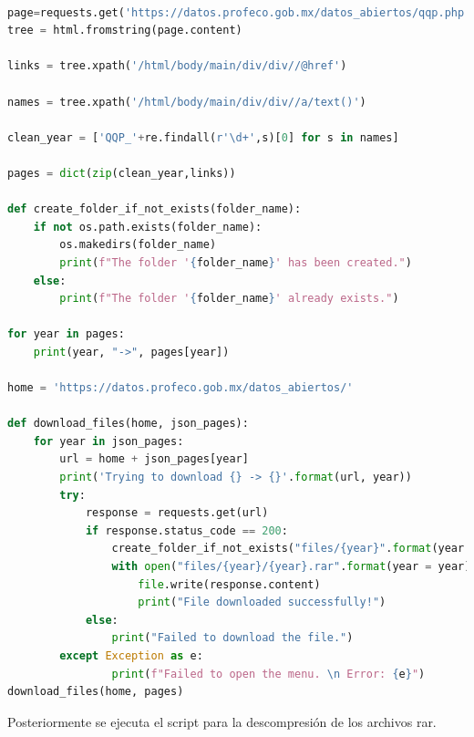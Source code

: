 \documentclass{article}
\begin{document}
\begin{lstlisting}[language=Python, caption={python version}]

page=requests.get('https://datos.profeco.gob.mx/datos_abiertos/qqp.php')
tree = html.fromstring(page.content)

links = tree.xpath('/html/body/main/div/div//@href')

names = tree.xpath('/html/body/main/div/div//a/text()')

clean_year = ['QQP_'+re.findall(r'\d+',s)[0] for s in names]

pages = dict(zip(clean_year,links))

def create_folder_if_not_exists(folder_name):
    if not os.path.exists(folder_name):
        os.makedirs(folder_name)
        print(f"The folder '{folder_name}' has been created.")
    else:
        print(f"The folder '{folder_name}' already exists.")

for year in pages:
    print(year, "->", pages[year])

home = 'https://datos.profeco.gob.mx/datos_abiertos/'

def download_files(home, json_pages):
    for year in json_pages:
        url = home + json_pages[year]
        print('Trying to download {} -> {}'.format(url, year))
        try:
            response = requests.get(url)
            if response.status_code == 200:
                create_folder_if_not_exists("files/{year}".format(year = year))
                with open("files/{year}/{year}.rar".format(year = year), "wb") as file:
                    file.write(response.content)
                    print("File downloaded successfully!")
            else:
                print("Failed to download the file.")
        except Exception as e:
                print(f"Failed to open the menu. \n Error: {e}")
download_files(home, pages)
\end{lstlisting}

Posteriormente se ejecuta el script para la descompresión de los archivos rar.
\end{document}
